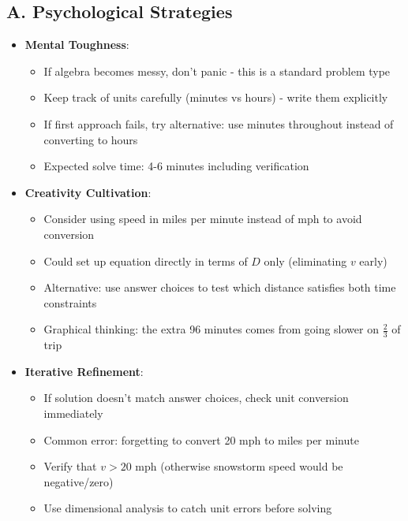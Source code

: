 \documentclass[11pt]{article}
\begin{document}
\begin{strategicbox}
\subsection*{A. Psychological Strategies}
\begin{itemize}[leftmargin=*]
    \item \textbf{Mental Toughness}: 
    \begin{itemize}[leftmargin=*]
        \item If algebra becomes messy, don't panic - this is a standard problem type
        \item Keep track of units carefully (minutes vs hours) - write them explicitly
        \item If first approach fails, try alternative: use minutes throughout instead of converting to hours
        \item Expected solve time: 4-6 minutes including verification
    \end{itemize}
    
    \item \textbf{Creativity Cultivation}: 
    \begin{itemize}[leftmargin=*]
        \item Consider using speed in miles per minute instead of mph to avoid conversion
        \item Could set up equation directly in terms of $D$ only (eliminating $v$ early)
        \item Alternative: use answer choices to test which distance satisfies both time constraints
        \item Graphical thinking: the extra 96 minutes comes from going slower on $\frac{2}{3}$ of trip
    \end{itemize}
    
    \item \textbf{Iterative Refinement}: 
    \begin{itemize}[leftmargin=*]
        \item If solution doesn't match answer choices, check unit conversion immediately
        \item Common error: forgetting to convert 20 mph to miles per minute
        \item Verify that $v > 20$ mph (otherwise snowstorm speed would be negative/zero)
        \item Use dimensional analysis to catch unit errors before solving
    \end{itemize}
\end{itemize}


\end{strategicbox}
\end{document}
